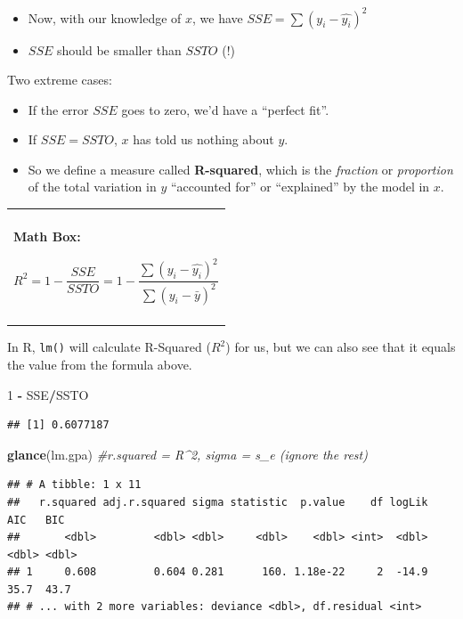 \documentclass[]{book}
\newenvironment{Shaded}{\begin{snugshade}}{\end{snugshade}}
\newcommand{\CommentTok}[1]{\textcolor[rgb]{0.56,0.35,0.01}{\textit{#1}}}
\newcommand{\DecValTok}[1]{\textcolor[rgb]{0.00,0.00,0.81}{#1}}
\newcommand{\KeywordTok}[1]{\textcolor[rgb]{0.13,0.29,0.53}{\textbf{#1}}}
\newcommand{\NormalTok}[1]{#1}
\newcommand{\OperatorTok}[1]{\textcolor[rgb]{0.81,0.36,0.00}{\textbf{#1}}}
\newcommand{\StringTok}[1]{\textcolor[rgb]{0.31,0.60,0.02}{#1}}
\newenvironment{mathbox}
{
    \begin{center}
    
    \begin{tabular}{|p{0.8\textwidth}|}
    \rowcolor{LightYellow}
    \hline\\
    \rowcolor{LightYellow}
    \textbf{Math Box:}
}
{
    \\\rowcolor{LightYellow}
    \\\hline
    \end{tabular} 
    \end{center}
}
\begin{document}
\begin{itemize}
\item
  Now, with our knowledge of \(x\), we have \(SSE = \sum{(y_i - \hat{y_i})^2}\)
\item
  \(SSE\) should be smaller than \(SSTO\) (!)
\end{itemize}

Two extreme cases:

\begin{itemize}
\item
  If the error \(SSE\) goes to zero, we'd have a ``perfect fit''.
\item
  If \(SSE = SSTO\), \(x\) has told us nothing about \(y\).
\item
  So we define a measure called \textbf{R-squared}, which is the \emph{fraction} or \emph{proportion} of the total variation in \(y\) ``accounted for'' or ``explained'' by the model in \(x\).
\end{itemize}

\begin{mathbox}
\[ R^2 = 1 - \frac{SSE}{SSTO} = 1 - \frac{ \sum{(y_i - \hat{y_i})^2}}{ \sum{(y_i - \bar{y})^2}}\]
\end{mathbox}

In R, \texttt{lm()} will calculate R-Squared (\(R^2\)) for us, but we can also see that it equals the value from the formula above.

\begin{Shaded}
\begin{Highlighting}[]
\DecValTok{1} \OperatorTok{-}\StringTok{ }\NormalTok{SSE}\OperatorTok{/}\NormalTok{SSTO}
\end{Highlighting}
\end{Shaded}

\begin{verbatim}
## [1] 0.6077187
\end{verbatim}

\begin{Shaded}
\begin{Highlighting}[]
\KeywordTok{glance}\NormalTok{(lm.gpa) }\CommentTok{#r.squared = R^2, sigma = s_e (ignore the rest)}
\end{Highlighting}
\end{Shaded}

\begin{verbatim}
## # A tibble: 1 x 11
##   r.squared adj.r.squared sigma statistic  p.value    df logLik   AIC   BIC
##       <dbl>         <dbl> <dbl>     <dbl>    <dbl> <int>  <dbl> <dbl> <dbl>
## 1     0.608         0.604 0.281      160. 1.18e-22     2  -14.9  35.7  43.7
## # ... with 2 more variables: deviance <dbl>, df.residual <int>
\end{verbatim}
\end{document}
